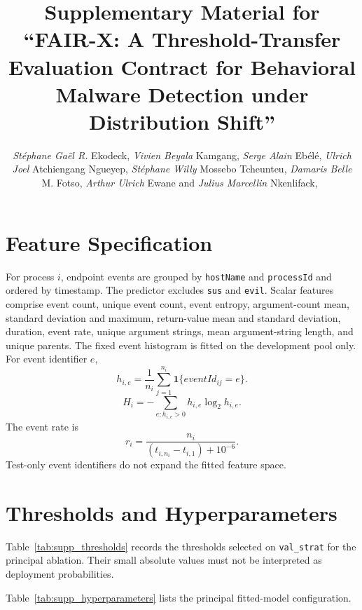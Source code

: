 \documentclass[10pt,journal,compsoc]{IEEEtran}
\begin{document}
\title{Supplementary Material for ``FAIR-X: A Threshold-Transfer Evaluation Contract for Behavioral Malware Detection under Distribution Shift''}

\author{\emph{St\'{e}phane Ga\"{e}l R.} Ekodeck, \emph{Vivien Beyala} Kamgang, \emph{Serge Alain} Eb\'{e}l\'{e}, \emph{Ulrich Joel} Atchiengang Ngueyep,  \emph{St\'{e}phane Willy} Mossebo Tcheunteu,  \emph{Damaris Belle} M. Fotso,  \emph{Arthur Ulrich} Ewane and \emph{Julius Marcellin} Nkenlifack,~}

\maketitle

\section{Feature Specification}

For process $i$, endpoint events are grouped by \texttt{hostName} and
\texttt{processId} and ordered by timestamp. The predictor excludes
\texttt{sus} and \texttt{evil}. Scalar features comprise event count, unique
event count, event entropy, argument-count mean, standard deviation and
maximum, return-value mean and standard deviation, duration, event rate,
unique argument strings, mean argument-string length, and unique parents.
The fixed event histogram is fitted on the development pool only. For event
identifier $e$,
\[
h_{i,e}=\frac{1}{n_i}\sum_{j=1}^{n_i}
\mathbf{1}\{eventId_{ij}=e\}.
\]
\[
H_i=-\sum_{e:h_{i,e}>0}h_{i,e}\log_2 h_{i,e}.
\]
The event rate is
\[
r_i=\frac{n_i}{(t_{i,n_i}-t_{i,1})+10^{-6}}.
\]
Test-only event identifiers do not expand the fitted feature space.

\section{Thresholds and Hyperparameters}

Table~\ref{tab:supp_thresholds} records the thresholds selected on
\texttt{val\_strat} for the principal ablation. Their small absolute values
must not be interpreted as deployment probabilities.

Table~\ref{tab:supp_hyperparameters} lists the principal fitted-model
configuration.
\end{document}
